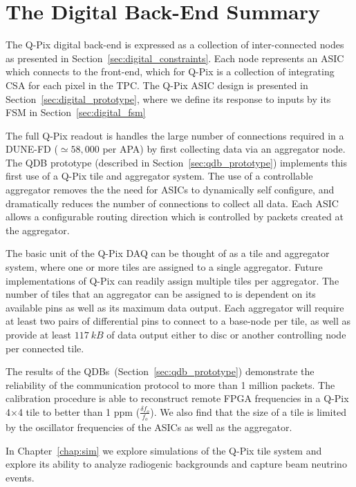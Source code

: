 \section{The Digital Back-End Summary}

The Q-Pix digital back-end is expressed as a collection of inter-connected nodes as presented in Section~\ref{sec:digital_constraints}.
Each node represents an ASIC which connects to the front-end, which for Q-Pix is a collection of integrating CSA for each pixel in the TPC.
The Q-Pix ASIC design is presented in Section~\ref{sec:digital_prototype}, where we define its response to inputs by its FSM in Section~\ref{sec:digital_fsm}

The full Q-Pix readout is handles the large number of connections required in a DUNE-FD ($\simeq 58,000$ per APA) by first collecting data via an aggregator node.
The QDB prototype (described in Section~\ref{sec:qdb_prototype}) implements this first use of a Q-Pix tile and aggregator system.
The use of a controllable aggregator removes the the need for ASICs to dynamically self configure, and dramatically reduces the number of connections to collect all data.
Each ASIC allows a configurable routing direction which is controlled by packets created at the aggregator.

The basic unit of the Q-Pix DAQ can be thought of as a tile and aggregator system, where one or more tiles are assigned to a single aggregator.
Future implementations of Q-Pix can readily assign multiple tiles per aggregator.
The number of tiles that an aggregator can be assigned to is dependent on its available pins as well as its maximum data output.
Each aggregator will require at least two pairs of differential pins to connect to a base-node per tile, as well as provide at least $117~\unit{kB}$ of data output either to disc or another controlling node per connected tile.

The results of the QDBs~(Section~\ref{sec:qdb_prototype}) demonstrate the reliability of the communication protocol to more than 1 million packets.
The calibration procedure is able to reconstruct remote FPGA frequencies in a Q-Pix 4$\times$4 tile to better than 1 ppm ($\frac{\delta f_{o}}{f_{o}}$).
We also find that the size of a tile is limited by the oscillator frequencies of the ASICs as well as the aggregator.

In Chapter~\ref{chap:sim} we explore simulations of the Q-Pix tile system and explore its ability to analyze radiogenic backgrounds and capture beam neutrino events.




